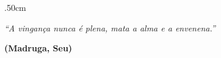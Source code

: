 \thispagestyle{empty}
\vspace*{\fill}
\begin{changemargin}{.5\textwidth}{0cm}
\singlespacing%
\begin{flushright}
    \textit{``A vingança nunca é plena, mata a alma e a envenena.''}
    \vspace{0.5cm}

    \textbf{(Madruga, Seu)}
\end{flushright}
\end{changemargin}